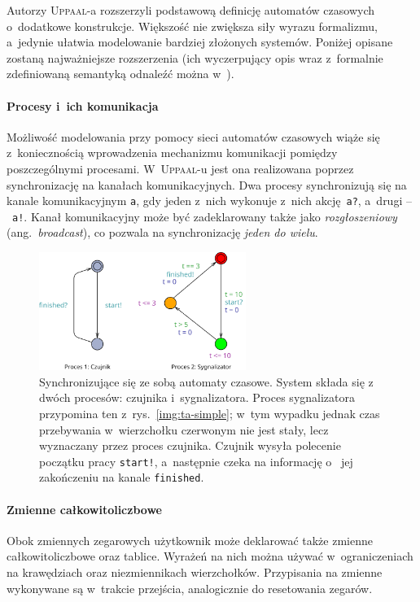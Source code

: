 \documentclass{pracamgr}
\newcommand{\ang}[1]{(ang.~\emph{#1})}
\newcommand{\imgr}[1]{rys.~\ref{#1}}
\newcommand{\upp}{\textsc{Uppaal}}
\theoremstyle{plain}
\begin{document}
Autorzy \upp-a rozszerzyli podstawową definicję automatów czasowych
o~dodatkowe konstrukcje. Większość nie zwiększa siły
wyrazu formalizmu, a~jedynie ułatwia modelowanie bardziej złożonych
systemów.  Poniżej opisane zostaną najważniejsze rozszerzenia
(ich wyczerpujący opis wraz z~formalnie zdefiniowaną semantyką
odnaleźć można w~\cite{by-lncs04}).
\paragraph{Procesy i~ich komunikacja} Możliwość modelowania przy
pomocy sieci automatów czasowych wiąże się z~koniecznością
wprowadzenia mechanizmu komunikacji pomiędzy poszczególnymi
procesami. W~\upp-u jest ona realizowana poprzez synchronizację na
kanałach komunikacyjnych. Dwa procesy synchronizują się na kanale
komunikacyjnym \texttt{a}, gdy jeden z~nich wykonuje z~nich
akcję~\texttt{a?}, a~drugi --~\texttt{a!}. Kanał komunikacyjny może
być zadeklarowany także jako \emph{rozgłoszeniowy} \ang{broadcast}, co
pozwala na synchronizację \emph{jeden do wielu}.
\begin{figure}
  \includegraphics[width=0.6\textwidth]{img/ta-communication}
  \caption[Synchronizujące się ze sobą automaty czasowe.]
  {Synchronizujące się ze sobą automaty czasowe. System składa się
z~    dwóch procesów: czujnika i~sygnalizatora. Proces sygnalizatora
    przypomina ten z~\imgr{img:ta-simple}; w~tym wypadku jednak czas
    przebywania w~wierzchołku czerwonym nie jest stały, lecz
    wyznaczany przez proces czujnika. Czujnik wysyła polecenie
    początku pracy \texttt{start!}, a~następnie czeka na informację
o~    jej zakończeniu na kanale \texttt{finished}.}
\end{figure}

\paragraph{Zmienne całkowitoliczbowe} Obok zmiennych zegarowych
użytkownik może deklarować także zmienne całkowitoliczbowe oraz
tablice. Wyrażeń na nich można używać w~ograniczeniach na krawędziach
oraz niezmiennikach wierzchołków. Przypisania na zmienne wykonywane są
w~trakcie przejścia, analogicznie do resetowania zegarów.
\end{document}
